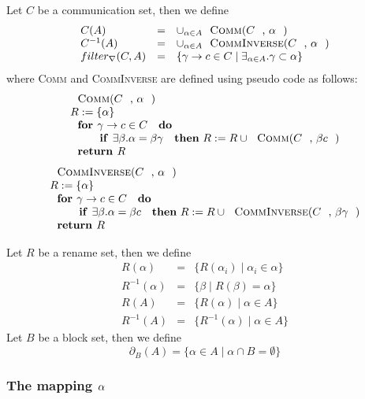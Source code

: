 \documentclass{article}
\begin{document}
Let $C$ be a communication set, then we define%
\[
\begin{array}{lll}
C(A) & = & \cup _{\alpha \in A}\text{\textsc{Comm}(}C\text{, }\alpha \text{)}
\\ 
C^{-1}(A) & = & \cup _{\alpha \in A}\text{\textsc{CommInverse}(}C\text{, }%
\alpha \text{)} \\ 
filter_{\nabla }(C,A) & = & \{\gamma \rightarrow c\in C\mid \exists _{\alpha
\in A}.\gamma \subset \alpha \}%
\end{array}%
\]%
where \textsc{Comm} and \textsc{CommInverse} are defined using pseudo code
as follows:%
\[
\begin{array}{l}
\text{\textsc{Comm}(}C\text{, }\alpha \text{)} \\ 
R:=\{\alpha \} \\ 
\text{\textbf{for }}\gamma \rightarrow c\in C\text{ \textbf{do}} \\ 
\qquad \text{\textbf{if }}\exists \beta .\alpha =\beta \gamma \text{ \textbf{%
then} }R:=R\cup \text{\textsc{Comm}(}C\text{, }\beta c\text{)} \\ 
\text{\textbf{return }}R%
\end{array}%
\]%
\[
\begin{array}{l}
\text{\textsc{CommInverse}(}C\text{, }\alpha \text{)} \\ 
R:=\{\alpha \} \\ 
\text{\textbf{for }}\gamma \rightarrow c\in C\text{ \textbf{do}} \\ 
\qquad \text{\textbf{if }}\exists \beta .\alpha =\beta c\text{ \textbf{then} 
}R:=R\cup \text{\textsc{CommInverse}(}C\text{, }\beta \gamma \text{)} \\ 
\text{\textbf{return }}R%
\end{array}%
\]

Let $R$ be a rename set, then we define%
\begin{eqnarray*}
R(\alpha ) &=&\{R(\alpha _{i})\mid \alpha _{i}\in \alpha \} \\
R^{-1}(\alpha ) &=&\{\beta \mid R(\beta )=\alpha \} \\
R(A) &=&\{R(\alpha )\mid \alpha \in A\} \\
R^{-1}(A) &=&\{R^{-1}(\alpha )\mid \alpha \in A\}
\end{eqnarray*}%
Let $B$ be a block set, then we define%
\[
\partial _{B}(A)=\{\alpha \in A\mid \alpha \cap B=\emptyset \} 
\]

\subsubsection{The mapping $\protect\alpha $}
\end{document}

